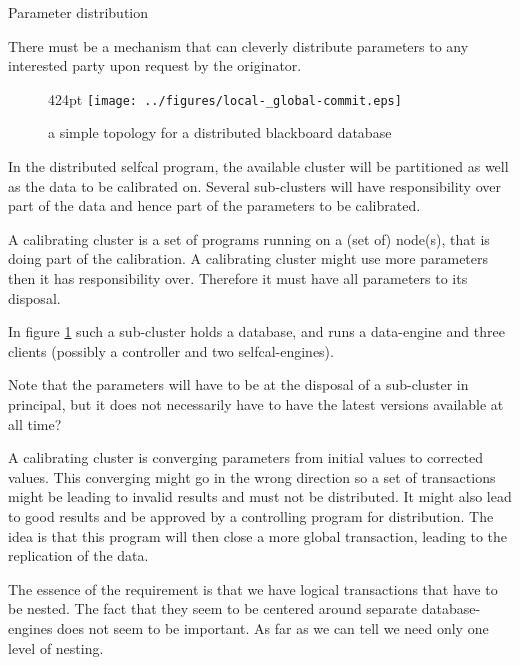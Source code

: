 \documentclass[]{lofar}
\begin{document}
      \begin{requirement}
        \caption{Parameter distribution\label{req:parameter-distribution}}
        There must be a mechanism that can cleverly distribute
        parameters to any interested party upon request by the
        originator.
      \end{requirement}

      \begin{figure}{424pt}
        \texttt{[image: ../figures/local-\_global-commit.eps]}
        \hypertarget{fig:localGlobalCommit}{}
        \caption{a simple topology for a distributed blackboard database\label{fig:localGlobalCommit}}
      \end{figure}

      In the distributed selfcal program, the available cluster will
      be partitioned as well as the data to be calibrated on. Several
      sub-clusters will have responsibility over part of the data and
      hence part of the parameters to be calibrated.

      A calibrating cluster is a set of programs running on a (set of)
      node(s), that is doing part of the calibration.  A calibrating
      cluster might use more parameters then it has responsibility
      over. Therefore it must have all parameters to its
      disposal.

      In figure
      \hyperlink{fig:localGlobalCommit}{\ref{fig:localGlobalCommit}}
      such a sub-cluster holds a database, and runs a data-engine and
      three clients (possibly a controller and two selfcal-engines).

      Note that the parameters will have to be at the disposal of a
      sub-cluster in principal, but it does not necessarily have to
      have the latest versions available at all time?

      A calibrating cluster is converging parameters from initial
      values to corrected values. This converging might go in the
      wrong direction so a set of transactions might be leading to
      invalid results and must not be distributed. It might also lead
      to good results and be approved by a controlling program for
      distribution. The idea is that this program will then close a
      more global transaction, leading to the replication of the data.

      The essence of the requirement is that we have logical
      transactions that have to be nested. The fact that they seem to
      be centered around separate database-engines does not seem to be
      important. As far as we can tell we need only one level of
      nesting.
\end{document}
